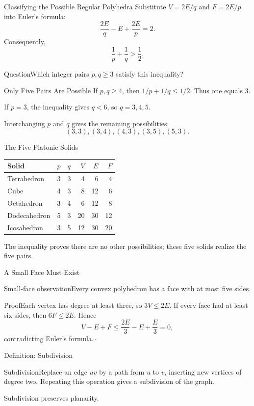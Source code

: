 \documentclass[aspectratio=169,11pt]{beamer}
\newcommand{\Def}[2]{\begin{block}{#1}#2\end{block}}
\newcommand{\Thm}[2]{\begin{block}{#1}#2\end{block}}
\renewcommand{\Proof}[1]{\begin{block}{Proof}\normalsize #1\end{block}}
\newcommand{\Question}[1]{\begin{block}{Question}#1\end{block}}
\newcommand{\gap}{\par\medskip}
\begin{document}
\begin{frame}{Classifying the Possible Regular Polyhedra}
\large
Substitute $V=2E/q$ and $F=2E/p$ into Euler's formula:
\[\frac{2E}{q}-E+\frac{2E}{p}=2.\]
Consequently,
\[\frac1p+\frac1q>\frac12.\]
\Question{Which integer pairs $p,q\ge3$ satisfy this inequality?}
\end{frame}
\begin{frame}{Only Five Pairs Are Possible}
\large
If $p,q\ge4$, then $1/p+1/q\le1/2$. Thus one equals $3$.
\gap If $p=3$, the inequality gives $q<6$, so $q=3,4,5$.
\gap Interchanging $p$ and $q$ gives the remaining possibilities:
\[(3,3),(3,4),(4,3),(3,5),(5,3).\]
\end{frame}
\begin{frame}{The Five Platonic Solids}
\large
\renewcommand{\arraystretch}{1.35}
\begin{center}\begin{tabular}{lccrrr}\toprule Solid & $p$ & $q$ & $V$ & $E$ & $F$\\\midrule Tetrahedron&3&3&4&6&4\\Cube&4&3&8&12&6\\Octahedron&3&4&6&12&8\\Dodecahedron&5&3&20&30&12\\Icosahedron&3&5&12&30&20\\\bottomrule\end{tabular}\end{center}
\gap The inequality proves there are no other possibilities; these five solids realize the five pairs.
\end{frame}
\begin{frame}{A Small Face Must Exist}
\large
\Thm{Small-face observation}{Every convex polyhedron has a face with at most five sides.}
\Proof{Each vertex has degree at least three, so $3V\le2E$. If every face had at least six sides, then $6F\le2E$. Hence\[V-E+F\le\frac{2E}{3}-E+\frac E3=0,\]contradicting Euler's formula.\hfill$\square$}
\end{frame}
\begin{frame}{Definition: Subdivision}
\large
\Def{Subdivision}{Replace an edge $uv$ by a path from $u$ to $v$, inserting new vertices of degree two. Repeating this operation gives a subdivision of the graph.}
\begin{center}\end{center}
Subdivision preserves planarity.
\end{frame}
\end{document}
